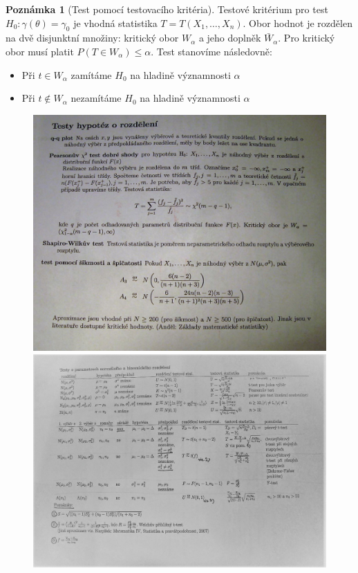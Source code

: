 \documentclass[a4]{report}
\theoremstyle{definition}
\newtheorem{notes}{Poznámka}[section]
\begin{document}
{\begin{notes}[Test pomocí testovacího kritéria]
Testové kritérium pro test $H_0 : \gamma \left(\theta \right) = \gamma_0$ je vhodná statistika $T=T \left(X_1,\ldots,X_n \right)$. Obor hodnot je rozdělen na dvě disjunktní množiny: kritický obor $W_{\alpha}$ a jeho doplněk $\bar{W}_{\alpha}$. Pro kritický obor musí platit $P \left(T \in W_{\alpha} \right) \leq \alpha$. Test stanovíme následovně: \begin{itemize}
\item Při $t \in W_{\alpha}$ zamítáme $H_0$ na hladině významnosti $\alpha$
\item Při $t \notin W_{\alpha}$ nezamítáme $H_0$ na hladině významnosti $\alpha$
\end{itemize}
\end{notes}

\begin{figure}[H]
\includegraphics[scale=1]{stat4.png}
\includegraphics[scale=1]{stat2.png}
\end{figure}

}
\end{document}
